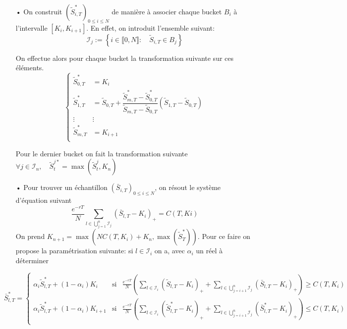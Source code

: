 \documentclass[a4paper,12pt]{report}
\numberwithin{equation}{section}
\theoremstyle{definition}
\numberwithin{equation}{section}
\begin{document}
\begin{itemize}
\item[•] On construit $\left(\tilde{S}_{i,T}^{*}\right)_{0\leq i\leq N}$ de manière à associer chaque bucket $B_{i}$ à l'intervalle $[K_{i},K_{i+1}]$. En effet, on introduit l'ensemble suivant:
$$\mathcal{I}_j := \left\{i\in \llbracket 0, N\rrbracket: \quad \tilde{S}_{i, T} \in B_j\right\}$$

On effectue alors pour chaque bucket la transformation suivante sur ces éléments.
$$\left\{
    \begin{array}{ll}
       \tilde{S}_{0,T}^{*} & =K_{i}\\
       \tilde{S}_{1,T}^{*} & =\tilde{S}_{0,T}^{}+\dfrac{\tilde{S}_{m,T}^{*}-\tilde{S}_{0,T}^{*}}{\tilde{S}_{m, T}-\tilde{S}_{0,T}}(\tilde{S}_{1,T}-\tilde{S}_{0,T})\\
        \vdots & \vdots\\
       \tilde{S}_{m,T}^{*} & =K_{i+1}\\
    \end{array}
\right.$$


Pour le dernier bucket on fait la transformation suivante $\forall j\in\mathcal{I}_{n},\quad\tilde{S}_{t}^{j*}=\max(\tilde{S}_{t}^{j},K_{n})$
\vspace*{0.1cm}
\item[•] Pour trouver un échantillon $\left(\bar{S}_{i,T}\right)_{0\leq i\leq N}$, on résout le système d'équation suivant  
\begin{equation}
\label{eq1}
\frac{e^{-rT}}{N}\sum_{l\in  \bigcup_{j=1}^{n}\mathcal{I}_{j}}(\bar{S}_{l,T}-K_{i})_{+}=C(T,K{i})
\end{equation}
On prend $K_{n+1}=\max(N C(T,K_{i})+K_{n},\max(\tilde{S}_{T}^{*}))$. Pour ce faire on propose la paramétrisation suivante: si $l\in\mathcal{I}_{i}$ on a, avec $\alpha_i$ un réel à déterminer
\end{itemize}
\vspace*{0.3cm}
\begin{equation}
\label{param}
\bar{S}_{l,T}^{*}=\left\{
    \begin{array}{lll}
       \alpha_{i}\tilde{S}_{l,T}^{*}+(1-\alpha_{i})K_{i} & \mbox{si}& \frac{e^{-rT}}{N}\displaystyle \left(\sum_{l\in\mathcal{I}_{i}}(\tilde{S}_{l,T}^{}-K_{i})_{+}+\sum_{l\in\bigcup_{j=i+1}^{n}\mathcal{I}_{j}}(\bar{S}_{l,T}^{}-K_{i})_{+}\right)\geq C(T,K_{i})\\
       \alpha_{i}\tilde{S}_{l,T}^{*}+(1-\alpha_{i})K_{i+1} & \mbox{si} &  \frac{e^{-rT}}{N} \displaystyle \left(\sum_{l\in\mathcal{I}_{i}}(\tilde{S}_{l,T}^{*}-K_{i})_{+}+\sum_{l\in\bigcup_{j=i+1}^{n}\mathcal{I}_{j}}(\bar{S}_{l,T}^{*}-K_{i})_{+}\right)\leq C(T,K_{i})\\
    \end{array}
\right.
\end{equation}
\end{document}
